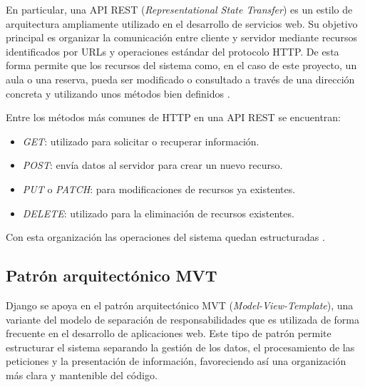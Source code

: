 En particular, una API REST (\textit{Representational State Transfer}) es un estilo de arquitectura ampliamente utilizado en el desarrollo de servicios web. Su objetivo principal es organizar la comunicación entre cliente y servidor mediante recursos identificados por URLs y operaciones estándar del protocolo HTTP. De esta forma permite que los recursos del sistema como, en el caso de este proyecto, un aula o una reserva, pueda ser modificado o consultado a través de una dirección concreta y utilizando unos métodos bien definidos \cite{metodosHttp:Oscar}.

Entre los métodos más comunes de HTTP en una API REST se encuentran:
\begin{itemize}
	\item \textit{GET}: utilizado para solicitar o recuperar información.
	\item \textit{POST}: envía datos al servidor para crear un nuevo recurso.
	\item \textit{PUT} o \textit{PATCH}: para modificaciones de recursos ya existentes.
	\item \textit{DELETE}: utilizado para la eliminación de recursos existentes.
\end{itemize}
Con esta organización las operaciones del sistema quedan estructuradas \cite{metodosHttp:Oscar}.


\subsection{Patrón arquitectónico MVT}

Django se apoya en el patrón arquitectónico MVT (\textit{Model-View-Template}), una variante del modelo de separación de responsabilidades que es utilizada de forma frecuente en el desarrollo de aplicaciones web. Este tipo de patrón permite estructurar el sistema separando la gestión de los datos, el procesamiento de las peticiones y la presentación de información, favoreciendo así una organización más clara y mantenible del código.


